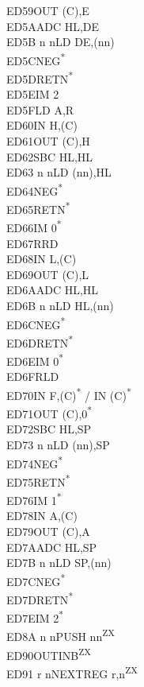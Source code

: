 \documentclass[oneside,a4paper]{book}
\begin{document}
\begin{multicols}{3}
{\begin{tabbing}
ED59\>OUT (C),E\\
ED5A\>ADC HL,DE\\
ED5B n n\>LD DE,(nn)\\
ED5C\>NEG\textsuperscript{*}\\
ED5D\>RETN\textsuperscript{*}\\
ED5E\>IM 2\\
ED5F\>LD A,R\\
ED60\>IN H,(C)\\
ED61\>OUT (C),H\\
ED62\>SBC HL,HL\\
ED63 n n\>LD (nn),HL\\
ED64\>NEG\textsuperscript{*}\\
ED65\>RETN\textsuperscript{*}\\
ED66\>IM 0\textsuperscript{*}\\
ED67\>RRD\\
ED68\>IN L,(C)\\
ED69\>OUT (C),L\\
ED6A\>ADC HL,HL\\
ED6B n n\>LD HL,(nn)\\
ED6C\>NEG\textsuperscript{*}\\
ED6D\>RETN\textsuperscript{*}\\
ED6E\>IM 0\textsuperscript{*}\\
ED6F\>RLD\\
ED70\>IN F,(C)\textsuperscript{*} / IN (C)\textsuperscript{*}\\
ED71\>OUT (C),0\textsuperscript{*}\\
ED72\>SBC HL,SP\\
ED73 n n\>LD (nn),SP\\
ED74\>NEG\textsuperscript{*}\\
ED75\>RETN\textsuperscript{*}\\
ED76\>IM 1\textsuperscript{*}\\
ED78\>IN A,(C)\\
ED79\>OUT (C),A\\
ED7A\>ADC HL,SP\\
ED7B n n\>LD SP,(nn)\\
ED7C\>NEG\textsuperscript{*}\\
ED7D\>RETN\textsuperscript{*}\\
ED7E\>IM 2\textsuperscript{*}\\
ED8A n n\>PUSH nn\textsuperscript{ZX}\\
ED90\>OUTINB\textsuperscript{ZX}\\
ED91 r n\>NEXTREG r,n\textsuperscript{ZX}\\

\end{tabbing}}
\end{multicols}
\end{document}
